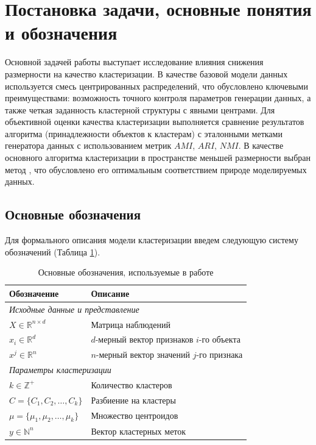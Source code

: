 \section{Постановка задачи, основные понятия и обозначения}
    Основной задачей работы выступает исследование влияния снижения размерности на качество кластеризации. В качестве базовой модели данных используется смесь центрированных распределений, что обусловлено ключевыми преимуществами: возможность точного контроля параметров генерации данных, а также четкая заданность кластерной структуры с явными центрами. Для объективной оценки качества кластеризации выполняется сравнение результатов алгоритма (принадлежности объектов к кластерам) с эталонными метками генератора данных с использованием метрик \(AMI\), \(ARI\), \(NMI\). В качестве основного алгоритма кластеризации в пространстве меньшей размерности выбран метод \kmeans{}, что обусловлено его оптимальным соответствием природе моделируемых данных.


    \subsection{Основные обозначения}
        Для формального описания модели кластеризации введем следующую систему обозначений (Таблица \ref{tab:notation}).

        \begin{table}[H]
            \centering
            \caption{Основные обозначения, используемые в работе}
            \label{tab:notation}
            \begin{tabularx}{\textwidth}{lX}
                \toprule
                \textbf{Обозначение} & \textbf{Описание} \\
                \midrule
                \multicolumn{2}{l}{\textit{Исходные данные и представление}} \\
                \midrule
                \(X \in \mathbb{R}^{n \times d}\) & Матрица наблюдений \\
                \(x_i \in \mathbb{R}^{d}\) & \(d\)-мерный вектор признаков \(i\)-го объекта \\
                \(x^j \in \mathbb{R}^{n}\) & \(n\)-мерный вектор значений \(j\)-го признака \\
                \midrule
                \multicolumn{2}{l}{\textit{Параметры кластеризации}} \\
                \midrule
                \(k \in \mathbb{Z}^+\) & Количество кластеров \\
                \( C = \{ C_1, C_2, \dots, C_k \}\) & Разбиение на кластеры \\
                \(\mu = \{\mu_1, \mu_2, \dots, \mu_k \} \) & Множество центроидов \\
                \(y \in \mathbb{N}^{n}\) & Вектор кластерных меток \\
                \bottomrule
            \end{tabularx}
        \end{table}


